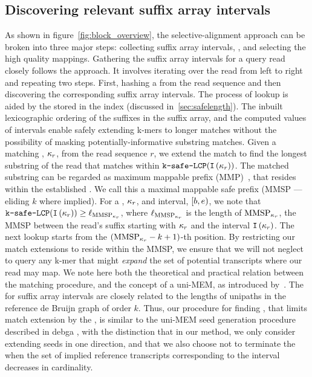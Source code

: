 \subsection{Discovering relevant suffix array intervals}
As shown in figure~\cref{fig:block_overview}, the selective-alignment approach can be 
broken into three major steps: collecting suffix array intervals, \cm, and selecting 
the high quality mappings. Gathering the suffix array intervals for a query read closely 
follows the \qm approach. It involves iterating over the read from left to right and 
repeating two steps. First, hashing a \kmer from the read sequence and then discovering the 
corresponding suffix array intervals. The process of \kmer lookup is aided by the \kslcp 
stored in the index (discussed in~\cref{sec:safelength}). The inbuilt lexicographic ordering 
of the suffixes in the suffix array, and the computed \kslcp values of intervals enable 
safely extending k-mers to longer matches without the possibility of masking 
potentially-informative substring matches. Given a matching \kmer, ${\kappa}_r$, 
from the read sequence $r$, we extend the match to find the longest substring of the 
read that matches within $\mathrm{\texttt{k-safe-LCP}}(\texttt{I}\left({\kappa}_r\right))$. The matched 
substring can be regarded as maximum mappable prefix (MMP)~\citep{Dobin2013Star}, that 
resides within the established \kslcp. We call this a maximal mappable safe prefix 
(MMSP --- eliding $k$ where implied). For a \kmer, ${\kappa}_r$, and interval, 
$\left[b,e\right)$, we note that $\mathrm{\texttt{\kslcp}}(\ival{\samplekmer_r}) 
\geq \length{\MMSP_{\samplekmer_r}}$, where $\length{\MMSP_{\samplekmer_r}}$ is the 
length of $\MMSP_{\samplekmer_r}$, the MMSP between the read's suffix starting with 
${\kappa}_r$ and the interval $\texttt{I}\left({\kappa}_r\right)$. The next \kmer lookup starts 
from the $(\MMSP_{\samplekmer_r}-k+1)$-th position. By restricting our match extensions 
to reside within the MMSP, we ensure that we will not neglect to query any k-mer that 
might \emph{expand} the set of potential transcripts where our read may map. We note 
here both the theoretical and practical relation between the \MMSP matching procedure, 
and the concept of a uni-MEM, as introduced by~\citet{debga}. The \kslcp for suffix array 
intervals are closely related to the lengths of unipaths in the reference de Bruijn 
graph of order $k$. Thus, our procedure for finding , that limits match 
extension by the \kslcp, is similar to the uni-MEM seed generation procedure described 
in debga \citep{debga}, with the distinction that in our method, we only consider extending 
seeds in one direction, and that we also choose not to terminate the \kslcp when the set 
of implied reference transcripts corresponding to the interval decreases in cardinality.

